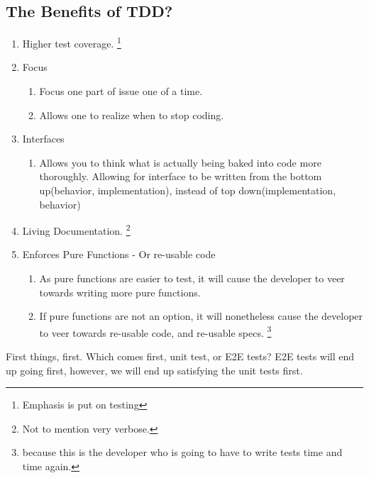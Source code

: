 \subsection{ The Benefits of TDD? }
\begin{enumerate}
  \item Higher test coverage. \footnote{Emphasis is put on testing}
  \item Focus
    \begin{enumerate}
      \item Focus one part of issue one of a time.
      \item Allows one to realize when to stop coding.
    \end{enumerate}
  \item Interfaces
    \begin{enumerate}
      \item Allows you to think what is actually being baked into code more
      thoroughly. Allowing for interface to be written from the bottom
      up(behavior, implementation), instead of top down(implementation,
      behavior)
    \end{enumerate}
  \item Living Documentation. \footnote{Not to mention very verbose.}
  \item Enforces Pure Functions - Or re-usable code
    \begin{enumerate}
      \item As pure functions are easier to test, it will cause the developer
      to veer towards writing more pure functions.
      \item If pure functions are not an option, it will nonetheless cause the
      developer to veer towards re-usable code, and re-usable specs. \footnote{
      because this is the developer who is going to have to write tests time
      and time again.
      }
    \end{enumerate}
\end{enumerate}


First things, first. Which comes first, unit test, or E2E tests? E2E tests will
end up going first, however, we will end up satisfying the unit tests first.
